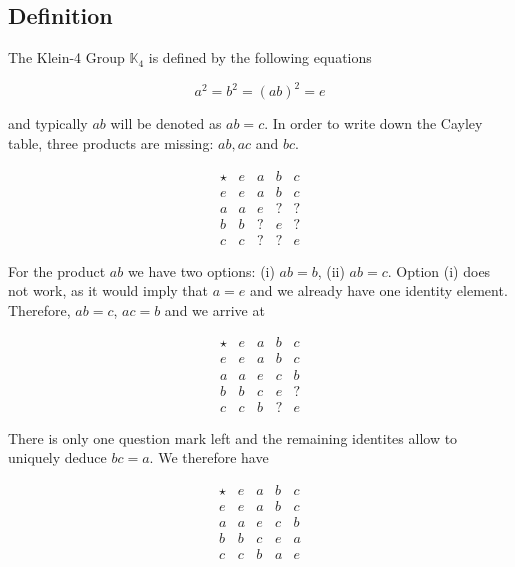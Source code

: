 
\subsection{Definition}\label{definition}

The Klein-4 Group \(\mathbb{K}_4\) is defined by the following equations

\[
a^2 = b^2 = (ab)^2 = e
\]

and typically \(ab\) will be denoted as \(ab = c\). In order to write
down the Cayley table, three products are missing: \(ab, ac\) and
\(bc\).

\[
\begin{array}{c|cccc}
\star   & e     & a    & b   & c     \\
\hline
e       & e     & a    & b   & c     \\
a       & a     & e    & ?   & ?     \\
b       & b     & ?    & e   & ?     \\
c       & c     & ?    & ?   & e
\end{array}
\]

For the product \(ab\) we have two options: (i) \(ab = b\), (ii)
\(ab = c\). Option (i) does not work, as it would imply that \(a = e\)
and we already have one identity element. Therefore, \(ab = c\),
\(ac = b\) and we arrive at

\[
\begin{array}{c|cccc}
\star   & e     & a    & b   & c     \\
\hline
e       & e     & a    & b   & c     \\
a       & a     & e    & c   & b     \\
b       & b     & c    & e   & ?     \\
c       & c     & b    & ?   & e
\end{array}
\]

There is only one question mark left and the remaining identites allow
to uniquely deduce \(bc = a\). We therefore have

\[
\begin{array}{c|cccc}
\star   & e     & a    & b   & c     \\
\hline
e       & e     & a    & b   & c     \\
a       & a     & e    & c   & b     \\
b       & b     & c    & e   & a     \\
c       & c     & b    & a   & e
\end{array}
\]


